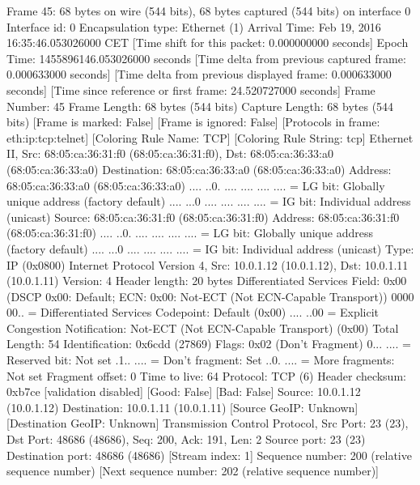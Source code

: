 Frame 45: 68 bytes on wire (544 bits), 68 bytes captured (544 bits) on interface 0
    Interface id: 0
    Encapsulation type: Ethernet (1)
    Arrival Time: Feb 19, 2016 16:35:46.053026000 CET
    [Time shift for this packet: 0.000000000 seconds]
    Epoch Time: 1455896146.053026000 seconds
    [Time delta from previous captured frame: 0.000633000 seconds]
    [Time delta from previous displayed frame: 0.000633000 seconds]
    [Time since reference or first frame: 24.520727000 seconds]
    Frame Number: 45
    Frame Length: 68 bytes (544 bits)
    Capture Length: 68 bytes (544 bits)
    [Frame is marked: False]
    [Frame is ignored: False]
    [Protocols in frame: eth:ip:tcp:telnet]
    [Coloring Rule Name: TCP]
    [Coloring Rule String: tcp]
Ethernet II, Src: 68:05:ca:36:31:f0 (68:05:ca:36:31:f0), Dst: 68:05:ca:36:33:a0 (68:05:ca:36:33:a0)
    Destination: 68:05:ca:36:33:a0 (68:05:ca:36:33:a0)
        Address: 68:05:ca:36:33:a0 (68:05:ca:36:33:a0)
        .... ..0. .... .... .... .... = LG bit: Globally unique address (factory default)
        .... ...0 .... .... .... .... = IG bit: Individual address (unicast)
    Source: 68:05:ca:36:31:f0 (68:05:ca:36:31:f0)
        Address: 68:05:ca:36:31:f0 (68:05:ca:36:31:f0)
        .... ..0. .... .... .... .... = LG bit: Globally unique address (factory default)
        .... ...0 .... .... .... .... = IG bit: Individual address (unicast)
    Type: IP (0x0800)
Internet Protocol Version 4, Src: 10.0.1.12 (10.0.1.12), Dst: 10.0.1.11 (10.0.1.11)
    Version: 4
    Header length: 20 bytes
    Differentiated Services Field: 0x00 (DSCP 0x00: Default; ECN: 0x00: Not-ECT (Not ECN-Capable Transport))
        0000 00.. = Differentiated Services Codepoint: Default (0x00)
        .... ..00 = Explicit Congestion Notification: Not-ECT (Not ECN-Capable Transport) (0x00)
    Total Length: 54
    Identification: 0x6cdd (27869)
    Flags: 0x02 (Don't Fragment)
        0... .... = Reserved bit: Not set
        .1.. .... = Don't fragment: Set
        ..0. .... = More fragments: Not set
    Fragment offset: 0
    Time to live: 64
    Protocol: TCP (6)
    Header checksum: 0xb7ce [validation disabled]
        [Good: False]
        [Bad: False]
    Source: 10.0.1.12 (10.0.1.12)
    Destination: 10.0.1.11 (10.0.1.11)
    [Source GeoIP: Unknown]
    [Destination GeoIP: Unknown]
Transmission Control Protocol, Src Port: 23 (23), Dst Port: 48686 (48686), Seq: 200, Ack: 191, Len: 2
    Source port: 23 (23)
    Destination port: 48686 (48686)
    [Stream index: 1]
    Sequence number: 200    (relative sequence number)
    [Next sequence number: 202    (relative sequence number)]
